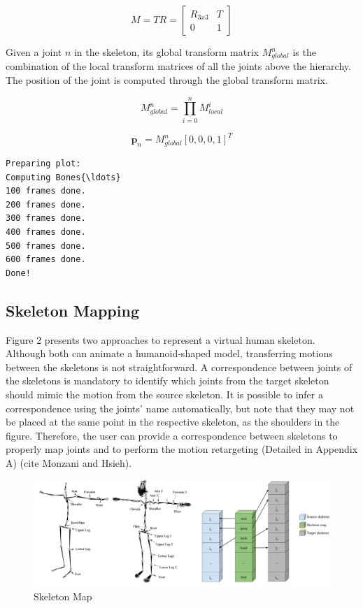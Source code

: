 \documentclass{vgtc}
\makeatletter
\def\maxwidth{\ifdim\Gin@nat@width>\linewidth\linewidth
    \else\Gin@nat@width\fi}
\let\Oldincludegraphics\includegraphics
\renewcommand{\includegraphics}[1]{\Oldincludegraphics[width=.8\maxwidth]{#1}}
\makeatother
\begin{document}
\begin{equation}
\label{eq:transformmatrix}
M = TR = \begin{bmatrix}
    R_{3x3} & T \\
    0 & 1
    \end{bmatrix}
\end{equation}

Given a joint \(n\) in the skeleton, its global transform matrix
\(M_{global}^{n}\) is the combination of the local transform matrices of
all the joints above the hierarchy. The position of the joint is
computed through the global transform matrix.

\begin{equation}
\label{eq:transformmatrixglobal}
M_{global}^{n} = \prod_{i=0}^{n} M_{local}^{i}
\end{equation}

\begin{equation}
\label{eq:position}
\mathbf{p}_{n} = M_{global}^{n}[0,0,0,1]^T
\end{equation}



    \begin{Verbatim}[commandchars=\\\{\}]
Preparing plot:
Computing Bones{\ldots}
100 frames done.
200 frames done.
300 frames done.
400 frames done.
500 frames done.
600 frames done.
Done!
\end{Verbatim}

    \hypertarget{skeleton-mapping}{%
\subsection{Skeleton Mapping}\label{skeleton-mapping}}

Figure 2 presents two approaches to represent a virtual human skeleton.
Although both can animate a humanoid-shaped model, transferring motions
between the skeletons is not straightforward. A correspondence between
joints of the skeletons is mandatory to identify which joints from the
target skeleton should mimic the motion from the source skeleton. It is
possible to infer a correspondence using the joints' name automatically,
but note that they may not be placed at the same point in the respective
skeleton, as the shoulders in the figure. Therefore, the user can
provide a correspondence between skeletons to properly map joints and to
perform the motion retargeting (Detailed in Appendix A) (cite Monzani
and Hsieh).

\begin{figure}
\centering
\includegraphics{../figures/skelmap.png}
\caption{Skeleton Map}
\end{figure}
\end{document}
